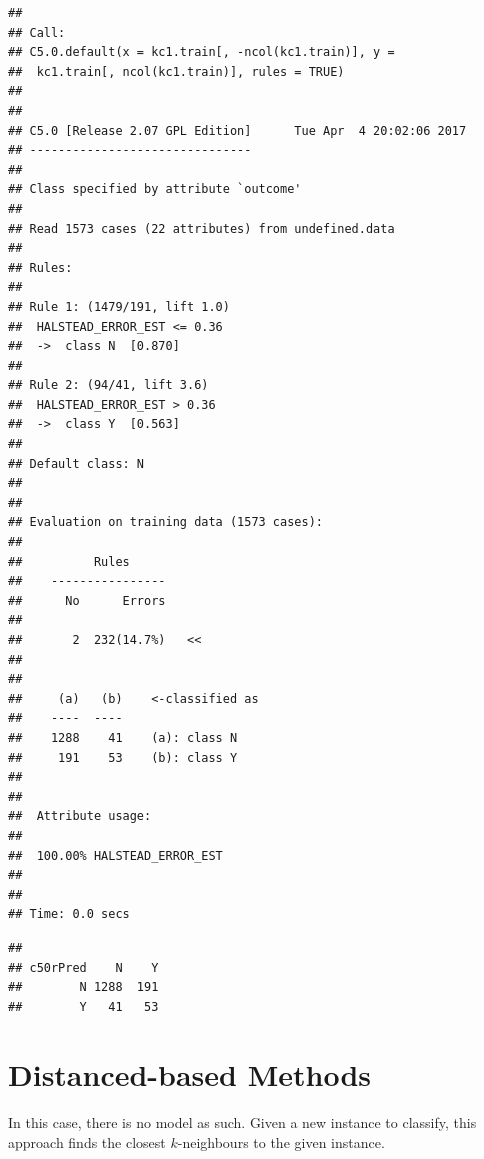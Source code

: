 \documentclass[]{book}
\newenvironment{Shaded}{\begin{snugshade}}{\end{snugshade}}
\newcommand{\KeywordTok}[1]{\textcolor[rgb]{0.13,0.29,0.53}{\textbf{{#1}}}}
\newcommand{\StringTok}[1]{\textcolor[rgb]{0.31,0.60,0.02}{{#1}}}
\newcommand{\NormalTok}[1]{{#1}}
\begin{document}
\begin{verbatim}
## 
## Call:
## C5.0.default(x = kc1.train[, -ncol(kc1.train)], y =
##  kc1.train[, ncol(kc1.train)], rules = TRUE)
## 
## 
## C5.0 [Release 2.07 GPL Edition]      Tue Apr  4 20:02:06 2017
## -------------------------------
## 
## Class specified by attribute `outcome'
## 
## Read 1573 cases (22 attributes) from undefined.data
## 
## Rules:
## 
## Rule 1: (1479/191, lift 1.0)
##  HALSTEAD_ERROR_EST <= 0.36
##  ->  class N  [0.870]
## 
## Rule 2: (94/41, lift 3.6)
##  HALSTEAD_ERROR_EST > 0.36
##  ->  class Y  [0.563]
## 
## Default class: N
## 
## 
## Evaluation on training data (1573 cases):
## 
##          Rules     
##    ----------------
##      No      Errors
## 
##       2  232(14.7%)   <<
## 
## 
##     (a)   (b)    <-classified as
##    ----  ----
##    1288    41    (a): class N
##     191    53    (b): class Y
## 
## 
##  Attribute usage:
## 
##  100.00% HALSTEAD_ERROR_EST
## 
## 
## Time: 0.0 secs
\end{verbatim}

\begin{Shaded}
\end{Shaded}

\begin{verbatim}
##         
## c50rPred    N    Y
##        N 1288  191
##        Y   41   53
\end{verbatim}

\section{Distanced-based Methods}\label{distanced-based-methods}

In this case, there is no model as such. Given a new instance to
classify, this approach finds the closest \(k\)-neighbours to the given
instance.
\end{document}
